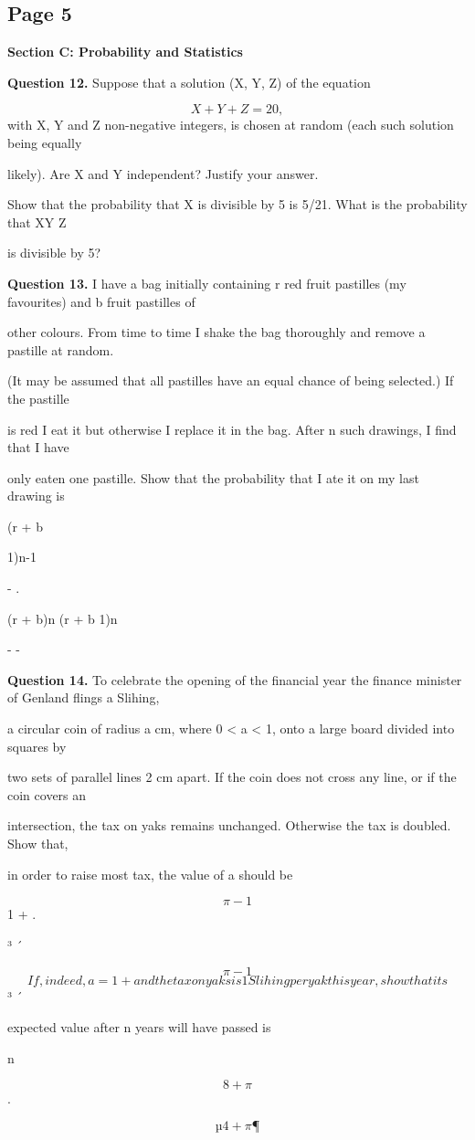 \documentclass[12pt]{article}
\begin{document}
\subsection*{Page 5}
\begin{flushleft}
\bigskip\textbf{Section C: Probability and Statistics}\par
\bigskip\textbf{Question 12.} Suppose that a solution (X, Y, Z) of the equation\par
\[X + Y + Z = 20,\]
with X, Y and Z non-negative integers, is chosen at random (each such solution being equally\par
likely). Are X and Y independent? Justify your answer.\par
Show that the probability that X is divisible by 5 is 5/21. What is the probability that XY Z\par
is divisible by 5?\par
\bigskip\textbf{Question 13.} I have a bag initially containing r red fruit pastilles (my favourites) and b fruit pastilles of\par
other colours. From time to time I shake the bag thoroughly and remove a pastille at random.\par
(It may be assumed that all pastilles have an equal chance of being selected.) If the pastille\par
is red I eat it but otherwise I replace it in the bag. After n such drawings, I find that I have\par
only eaten one pastille. Show that the probability that I ate it on my last drawing is\par
(r + b\par
1)n-1\par
- .\par
(r + b)n (r + b 1)n\par
- -\par
\bigskip\textbf{Question 14.} To celebrate the opening of the financial year the finance minister of Genland flings a Slihing,\par
a circular coin of radius a cm, where 0 < a < 1, onto a large board divided into squares by\par
two sets of parallel lines 2 cm apart. If the coin does not cross any line, or if the coin covers an\par
intersection, the tax on yaks remains unchanged. Otherwise the tax is doubled. Show that,\par
in order to raise most tax, the value of a should be\par
\[\pi -1\]
1 + .\par
³ ´\par
\[\pi -1\]
\[If, indeed, a = 1 + and the tax on yaks is 1 Slihing per yak this year, show that its\]
³ ´\par
expected value after n years will have passed is\par
n\par
\[8 + \pi\]
.\par
\[µ 4 + \pi ¶\]
\end{flushleft}
\end{document}
